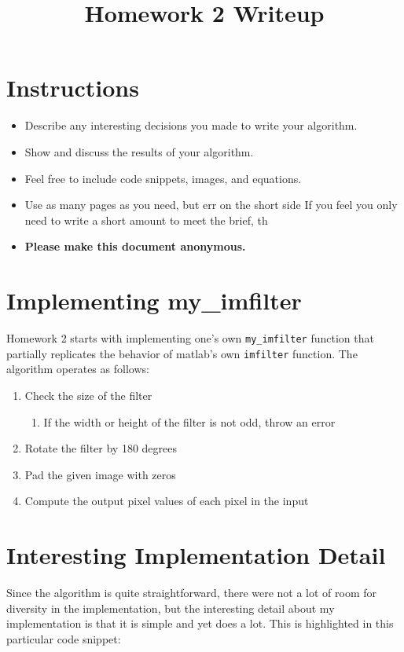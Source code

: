 \title{\vspace{-1cm}Homework 2 Writeup}



\maketitle
\vspace{-3cm}
\thispagestyle{fancy}

\section*{Instructions}
\begin{itemize}
  \item Describe any interesting decisions you made to write your algorithm.
  \item Show and discuss the results of your algorithm.
  \item Feel free to include code snippets, images, and equations.
  \item Use as many pages as you need, but err on the short side If you feel you only need to write a short amount to meet the brief, th

  \item \textbf{Please make this document anonymous.}
\end{itemize}

\section*{Implementing my\_imfilter}
Homework 2 starts with implementing one's own \texttt{my\_imfilter} function that partially replicates the behavior of matlab's own \texttt{imfilter} function. The algorithm operates as follows:
\begin{enumerate}
    \item Check the size of the filter
        \begin{enumerate}
            \item If the width or height of the filter is not odd, throw an error
        \end{enumerate}
    \item Rotate the filter by 180 degrees
    \item Pad the given image with zeros
    \item Compute the output pixel values of each pixel in the input
\end{enumerate}

\section*{Interesting Implementation Detail}
Since the algorithm is quite straightforward, there were not a lot of room for diversity in the implementation, but the interesting detail about my implementation is that it is simple and yet does a lot. This is highlighted in this particular code snippet:

